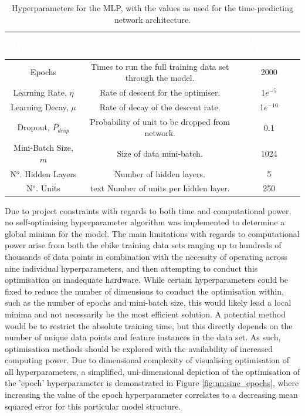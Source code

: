 \documentclass[a4paper, 10pt]{article}
\numberwithin{equation}{section}
\begin{document}
\begin{table}[h!]
    \centering
    \small
    \caption{Hyperparameters for the MLP, with the values as used for the time-predicting network architecture.}
    \begin{tabular}{|c|c|c|}
        \hline 
         \cellcolor{gray!120}\textcolor{white}{\textbf{Hyperparameter}} & \cellcolor{gray!120}\textcolor{white}{\textbf{Description}} & \cellcolor{gray!120}\textcolor{white}{\textbf{Example Values}} \\ 
         \hline
         \hline
         Epochs & Times to run the full training data set through the model. & 2000  \\ 
         Learning Rate, $\eta$ & Rate of descent for the optimiser. & 1$e^{-5}$  \\ 
         Learning Decay, $\mu$ & Rate of decay of the descent rate. & 1$e^{-10}$  \\ 
         Dropout, $P_{drop}$ & Probability of unit to be dropped from network. & 0.1  \\ 
         Mini-Batch Size, $m$ & Size of data mini-batch. & 1024  \\ 
         N$^{o}$. Hidden Layers & Number of hidden layers. & 5  \\ 
         N$^{o}$. Units & text Number of units per hidden layer. & 250  \\ 
        \hline
    \end{tabular}
    \label{tab:nn:generic_hyperparams}
\end{table}

Due to project constraints with regards to both time and computational power, no self-optimising hyperparameter algorithm was implemented to determine a global minima for the model. The main limitations with regards to computational power arise from both the ebike training data sets ranging up to hundreds of thousands of data points in combination with the necessity of operating across nine individual hyperparameters, and then attempting to conduct this optimisation on inadequate hardware. While certain hyperparameters could be fixed to reduce the number of dimensions to conduct the optimisation within, such as the number of epochs and mini-batch size, this would likely lead a local minima and not necessarily be the most efficient solution. A potential method would be to restrict the absolute training time, but this directly depends on the number of unique data points and feature instances in the data set. As such, optimisation methods should be explored with the availability of increased computing power. Due to dimensional complexity of visualising optimisation of all hyperparameters, a simplified, uni-dimensional depiction of the optimisation of the 'epoch' hyperparameter is demonstrated in Figure \ref{fig:nn:sine_epochs}, where increasing the value of the epoch hyperparameter correlates to a decreasing mean squared error for this particular model structure.
\end{document}
